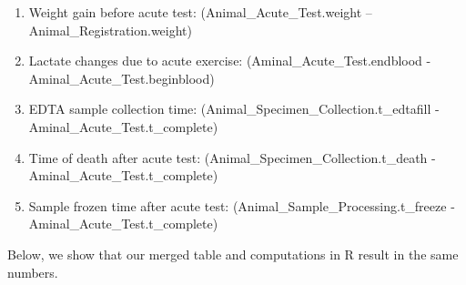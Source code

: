 \documentclass[]{article}
\providecommand{\tightlist}{%
  \setlength{\itemsep}{0pt}\setlength{\parskip}{0pt}}
\begin{document}
\begin{enumerate}
\def\labelenumi{\arabic{enumi}.}
\tightlist
\item
  Weight gain before acute test: (Animal\_Acute\_Test.weight --
  Animal\_Registration.weight)
\item
  Lactate changes due to acute exercise: (Aminal\_Acute\_Test.endblood -
  Aminal\_Acute\_Test.beginblood)
\item
  EDTA sample collection time: (Animal\_Specimen\_Collection.t\_edtafill
  - Aminal\_Acute\_Test.t\_complete)
\item
  Time of death after acute test: (Animal\_Specimen\_Collection.t\_death
  - Aminal\_Acute\_Test.t\_complete)
\item
  Sample frozen time after acute test:
  (Animal\_Sample\_Processing.t\_freeze -
  Aminal\_Acute\_Test.t\_complete)
\end{enumerate}

Below, we show that our merged table and computations in R result in the
same numbers.
\end{document}
